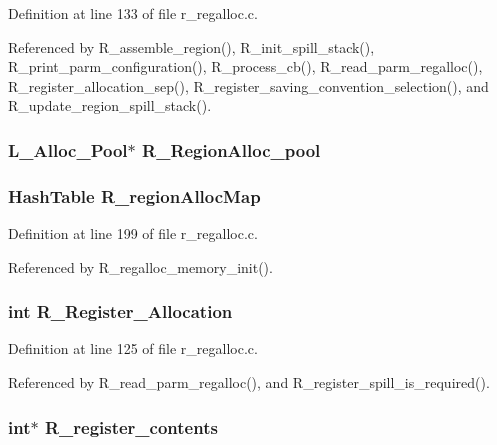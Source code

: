 Definition at line 133 of file r\_\-regalloc.c.

Referenced by R\_\-assemble\_\-region(), R\_\-init\_\-spill\_\-stack(), R\_\-print\_\-parm\_\-configuration(), R\_\-process\_\-cb(), R\_\-read\_\-parm\_\-regalloc(), R\_\-register\_\-allocation\_\-sep(), R\_\-register\_\-saving\_\-convention\_\-selection(), and R\_\-update\_\-region\_\-spill\_\-stack().
\subsubsection{\setlength{\rightskip}{0pt plus 5cm}\bf{L\_\-Alloc\_\-Pool}$\ast$ \bf{R\_\-Region\-Alloc\_\-pool}}\label{r__regalloc_8h_3639f07b92c3fabb0e608122d26b1ebd}


\subsubsection{\setlength{\rightskip}{0pt plus 5cm}\bf{Hash\-Table} \bf{R\_\-region\-Alloc\-Map}}\label{r__regalloc_8h_5995532566d405c35426e58b54ec4cc5}




Definition at line 199 of file r\_\-regalloc.c.

Referenced by R\_\-regalloc\_\-memory\_\-init().
\subsubsection{\setlength{\rightskip}{0pt plus 5cm}int \bf{R\_\-Register\_\-Allocation}}\label{r__regalloc_8h_da5733999d55af991a5c2cbdb4451e3a}




Definition at line 125 of file r\_\-regalloc.c.

Referenced by R\_\-read\_\-parm\_\-regalloc(), and R\_\-register\_\-spill\_\-is\_\-required().
\subsubsection{\setlength{\rightskip}{0pt plus 5cm}int$\ast$ \bf{R\_\-register\_\-contents}}\label{r__regalloc_8h_3ce7ce30fdd85726021a9fbe22baaa56}




